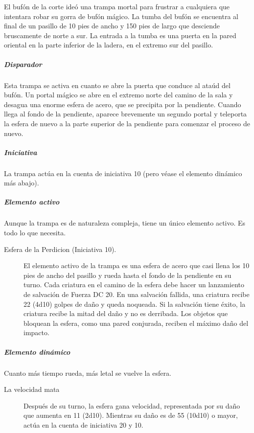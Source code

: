 \documentclass[a4paper,twocolumn,openany,10pt]{dndbook}
\begin{document}
El bufón de la corte ideó una trampa mortal para frustrar a cualquiera que intentara robar su gorra de bufón mágico. La tumba del
bufón se encuentra al final de un pasillo de 10 pies de ancho y 150 pies de largo que desciende bruscamente de norte a sur. La
entrada a la tumba es una puerta en la pared oriental en la parte inferior de la ladera, en el extremo sur del pasillo.

\subparagraph{Disparador} Esta trampa se activa en cuanto se abre la puerta que conduce al ataúd del bufón. Un portal mágico se
abre en el extremo norte del camino de la sala y desagua una enorme esfera de acero, que se precipita por la pendiente. Cuando
llega al fondo de la pendiente, aparece brevemente un segundo portal y teleporta la esfera de nuevo a la parte superior de la
pendiente para comenzar el proceso de nuevo. 

\subparagraph{Iniciativa} La trampa actúa en la cuenta de iniciativa 10 (pero véase el elemento dinámico más abajo).

\subparagraph{Elemento activo} Aunque la trampa es de naturaleza compleja, tiene un único elemento activo. Es todo lo que
necesita. 

\begin{description}
\item[Esfera de la Perdicion (Iniciativa 10).] El elemento activo de la trampa es una esfera de acero que casi
llena los 10 pies de ancho del pasillo y rueda hasta el fondo de la pendiente en su turno. Cada criatura en el camino de la
esfera debe hacer un lanzamiento de salvación de Fuerza DC 20. En una salvación fallida, una criatura recibe 22 (4d10) golpes de
daño y queda noqueada. Si la salvación tiene éxito, la criatura recibe la mitad del daño y no es derribada. Los objetos que
bloquean la esfera, como una pared conjurada, reciben el máximo daño del impacto. 
\end{description}

\subparagraph{Elemento dinámico} Cuanto más tiempo rueda, más letal se vuelve la esfera. 

\begin{description}
	\item[La velocidad mata] Después de su turno, la esfera gana velocidad, representada por su daño que aumenta en 11 (2d10).
	Mientras su daño es de 55 (10d10) o mayor, actúa en la cuenta de iniciativa 20 y 10.
\end{description}
\end{document}
